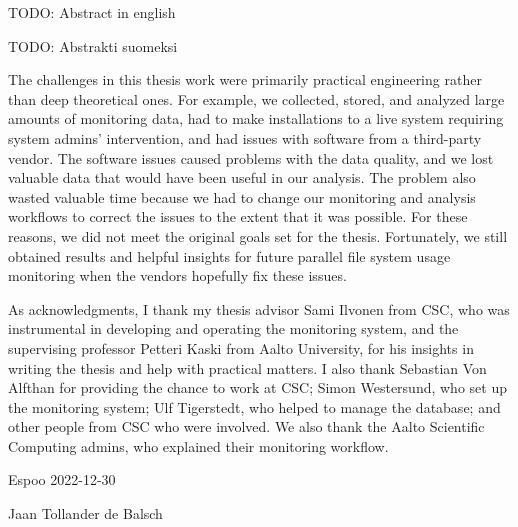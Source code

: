\makecoverpage
\makecopyrightpage


\begin{abstractpage}[english]
TODO: Abstract in english
\end{abstractpage}



\begin{abstractpage}[finnish]
TODO: Abstrakti suomeksi
\end{abstractpage}


The challenges in this thesis work were primarily practical engineering rather than deep theoretical ones.
For example, we collected, stored, and analyzed large amounts of monitoring data, had to make installations to a live system requiring system admins' intervention, and had issues with software from a third-party vendor.
The software issues caused problems with the data quality, and we lost valuable data that would have been useful in our analysis.
The problem also wasted valuable time because we had to change our monitoring and analysis workflows to correct the issues to the extent that it was possible.
For these reasons, we did not meet the original goals set for the thesis.
Fortunately, we still obtained results and helpful insights for future parallel file system usage monitoring when the vendors hopefully fix these issues.

As acknowledgments, I thank my thesis advisor Sami Ilvonen from CSC, who was instrumental in developing and operating the monitoring system, and the supervising professor Petteri Kaski from Aalto University, for his insights in writing the thesis and help with practical matters.
I also thank Sebastian Von Alfthan for providing the chance to work at CSC; Simon Westersund, who set up the monitoring system; Ulf Tigerstedt, who helped to manage the database; and other people from CSC who were involved.
We also thank the Aalto Scientific Computing admins, who explained their monitoring workflow.

\vspace{5cm}
Espoo 2022-12-30

\vspace{5mm}
{\hfill Jaan Tollander de Balsch \hspace{1cm}}

\newpage

\setcounter{tocdepth}{2}
\tableofcontents
